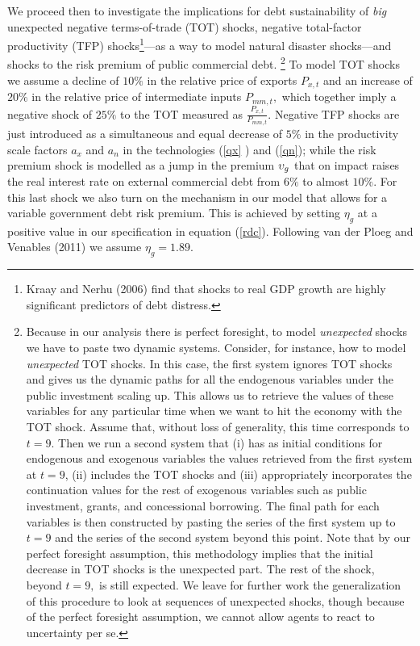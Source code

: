\documentclass[11pt]{article}
\begin{document}
We proceed then to investigate the implications for debt sustainability of 
\textit{big} unexpected negative terms-of-trade (TOT) shocks, negative
total-factor productivity (TFP) shocks\footnote{%
Kraay and Nerhu (2006) find that shocks to real GDP growth are highly
significant predictors of debt distress.}---as a way to model natural
disaster shocks---and shocks to the risk premium of public commercial debt.%
\footnote{%
Because in our analysis there is perfect foresight, to model \textit{%
unexpected} shocks we have to paste two dynamic systems. Consider, for
instance, how to model \textit{unexpected} TOT shocks. In this case, the
first system ignores TOT shocks and gives us the dynamic paths for all the
endogenous variables under the public investment scaling up. This allows us
to retrieve the values of these variables for any particular time when we
want to hit the economy with the TOT shock. Assume that, without loss of
generality, this time corresponds to $t=9.$ Then we run a second system that
(i) has as initial conditions for endogenous and exogenous variables the
values retrieved from the first system at $t=9$, (ii) includes the TOT
shocks and (iii) appropriately incorporates the continuation values for the
rest of exogenous variables such as public investment, grants, and
concessional borrowing. The final path for each variables is then
constructed by pasting the series of the first system up to $t=9$ and the
series of the second system beyond this point. Note that by our perfect
foresight assumption, this methodology implies that the initial decrease in
TOT shocks is the unexpected part. The rest of the shock, beyond $t=9,$ is
still expected. We leave for further work the generalization of this
procedure to look at sequences of unexpected shocks, though because of the
perfect foresight assumption, we cannot allow agents to react to uncertainty
per se.} To model TOT shocks we assume a decline of $10\%$ in the relative
price of exports $P_{x,t}$ and an increase of $20\%$ in the relative price
of intermediate inputs $P_{mm,t},$ which together imply a negative shock of $%
25\%$ to the TOT measured as $\frac{P_{x,t}}{P_{mm,t}}.$ Negative TFP shocks
are just introduced as a simultaneous and equal decrease of $5\%$ in the
productivity scale factors $a_{x}$ and $a_{n}$ in the technologies (\ref{qx}%
) and (\ref{qn}); while the risk premium shock is modelled as a jump in the
premium ${\small \upsilon }_{g}$ that on impact raises the real interest
rate on external commercial debt from $6\%$ to almost $10\%.$ For this last
shock we also turn on the mechanism in our model that allows for a variable
government debt risk premium. This is achieved by setting $\eta _{g}$ at a
positive value in our specification in equation (\ref{rdc}). Following van
der Ploeg and Venables (2011) we assume $\eta _{g}=1.89.$
\end{document}
